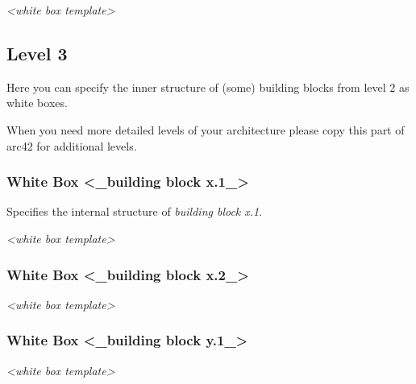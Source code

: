 \emph{\textless white box template\textgreater{}}

\hypertarget{_level_3}{%
\subsection{Level 3}\label{_level_3}}

Here you can specify the inner structure of (some) building blocks from
level 2 as white boxes.

When you need more detailed levels of your architecture please copy this
part of arc42 for additional levels.

\hypertarget{_white_box_building_block_x_1}{%
\subsubsection{White Box \textless\_building block
x.1\_\textgreater{}}\label{_white_box_building_block_x_1}}

Specifies the internal structure of \emph{building block x.1}.

\emph{\textless white box template\textgreater{}}

\hypertarget{_white_box_building_block_x_2}{%
\subsubsection{White Box \textless\_building block
x.2\_\textgreater{}}\label{_white_box_building_block_x_2}}

\emph{\textless white box template\textgreater{}}

\hypertarget{_white_box_building_block_y_1}{%
\subsubsection{White Box \textless\_building block
y.1\_\textgreater{}}\label{_white_box_building_block_y_1}}

\emph{\textless white box template\textgreater{}}
